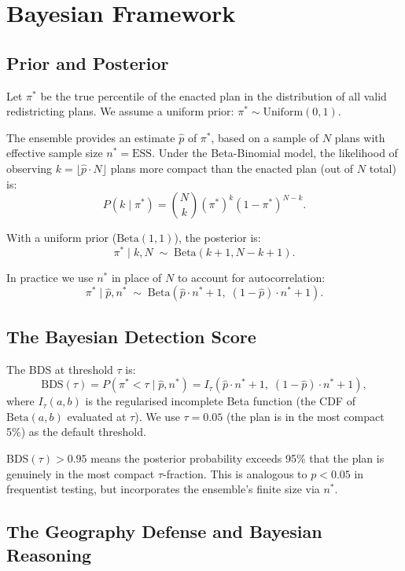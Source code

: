 \section{Bayesian Framework}

\subsection{Prior and Posterior}

Let $\pi^*$ be the true percentile of the enacted plan in the distribution
of all valid redistricting plans. We assume a uniform prior:
$\pi^* \sim \mathrm{Uniform}(0, 1)$.

The ensemble provides an estimate $\hat{p}$ of $\pi^*$, based on a sample
of $N$ plans with effective sample size $n^* = \mathrm{ESS}$.
Under the Beta-Binomial model, the likelihood of observing $k = \lfloor \hat{p} \cdot N \rfloor$
plans more compact than the enacted plan (out of $N$ total) is:
\[
  P(k \mid \pi^*) = \binom{N}{k} (\pi^*)^k (1-\pi^*)^{N-k}.
\]

With a uniform prior ($\mathrm{Beta}(1,1)$), the posterior is:
\[
  \pi^* \mid k, N \;\sim\; \mathrm{Beta}(k+1, N-k+1).
\]

In practice we use $n^*$ in place of $N$ to account for autocorrelation:
\[
  \pi^* \mid \hat{p}, n^* \;\sim\; \mathrm{Beta}(\hat{p} \cdot n^* + 1,\;
  (1-\hat{p})\cdot n^* + 1).
\]

\subsection{The Bayesian Detection Score}

\begin{definition}
\label{def:bds}
The BDS at threshold $\tau$ is:
\[
  \mathrm{BDS}(\tau) = P(\pi^* < \tau \mid \hat{p}, n^*)
  = I_\tau(\hat{p}\cdot n^* + 1,\; (1-\hat{p})\cdot n^* + 1),
\]
where $I_\tau(a, b)$ is the regularised incomplete Beta function (the CDF of
$\mathrm{Beta}(a, b)$ evaluated at $\tau$).
We use $\tau = 0.05$ (the plan is in the most compact 5\%) as the default
threshold.
\end{definition}

BDS$(\tau) > 0.95$ means the posterior probability exceeds 95\% that the plan
is genuinely in the most compact $\tau$-fraction. This is analogous to $p < 0.05$
in frequentist testing, but incorporates the ensemble's finite size via $n^*$.

\subsection{The Geography Defense and Bayesian Reasoning}

